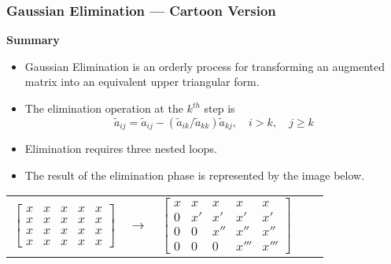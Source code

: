 \documentclass[10pt]{beamer}
\begin{document}
\begin{frame}
\frametitle{Gaussian Elimination --- Cartoon Version}

\textbf{Summary}
\vspace{0.0cm}
\begin{itemize}
\item	Gaussian Elimination is an orderly process for transforming
		an augmented matrix into an equivalent upper triangular form.
\item	The elimination operation at the $k^{th}$ step is
\begin{equation*}
			\tilde{a}_{ij} = \tilde{a}_{ij} - (\tilde{a}_{ik}/\tilde{a}_{kk})\tilde{a}_{kj},\quad i>k, \quad j\ge k
\end{equation*}
\item	Elimination requires three nested loops.
\item	The result of the elimination phase is represented by the image below.
\end{itemize}
\begin{center}
	\renewcommand{\arraystretch}{1.3}
	\small
	\begin{tabular}{ccccc}
        $\begin{bmatrix}   x  & x & x & x & x \\
                           x  & x  & x  & x  & x  \\
                           x  & x  & x  & x  & x \\
                           x  & x  & x  & x  & x \end{bmatrix}$
		& $\longrightarrow$ &
		$\begin{bmatrix} x & x  &  x   & x    & x   \\
						 0 & x' &  x'  & x'   & x'  \\
						 0 & 0  &  x'' & x''  & x'' \\
						 0 & 0  &  0   & x''' & x''' \end{bmatrix}$ 
	\end{tabular}
\end{center}



\end{frame}
\end{document}
